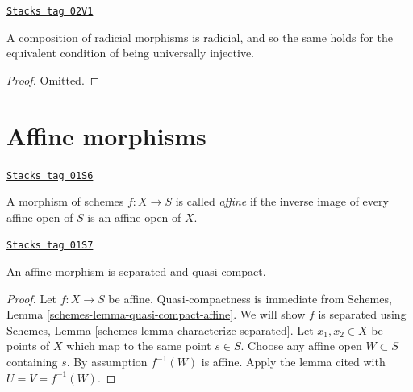 \begin{lemma}
\label{morphisms-lemma-composition-universally-injective}
\href{https://stacks.math.columbia.edu/tag/02V1}{\texttt{Stacks tag 02V1}}

A composition of radicial morphisms is radicial, and so the same holds
for the equivalent condition of being universally injective.
\end{lemma}

\begin{proof}
Omitted.
\end{proof}

\section{Affine morphisms}
\label{morphisms-section-affine}
\begin{definition}[Affine]
\label{morphisms-definition-affine}
\href{https://stacks.math.columbia.edu/tag/01S6}{\texttt{Stacks tag 01S6}}

A morphism of schemes $f : X \to S$ is called {\it affine} if
the inverse image of every affine open of $S$ is an affine
open of $X$.
\end{definition}

\begin{lemma}
\label{morphisms-lemma-affine-separated}
\href{https://stacks.math.columbia.edu/tag/01S7}{\texttt{Stacks tag 01S7}}

An affine morphism is separated and quasi-compact.
\end{lemma}

\begin{proof}
Let $f : X \to S$ be affine. Quasi-compactness is immediate from
Schemes, Lemma \ref{schemes-lemma-quasi-compact-affine}.
We will show $f$ is separated using
Schemes, Lemma \ref{schemes-lemma-characterize-separated}. Let
$x_1, x_2 \in X$ be points of $X$ which map to the same point $s \in S$.
Choose any affine open $W \subset S$ containing $s$. By assumption
$f^{-1}(W)$ is affine. Apply the lemma cited with $U = V = f^{-1}(W)$.
\end{proof}

